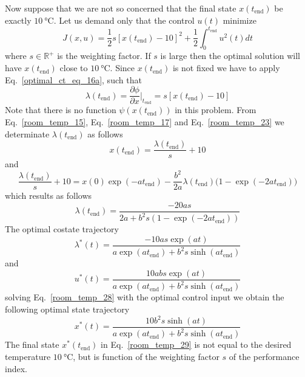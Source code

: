 \documentclass[12pt,a4paper,oneside]{book}
\begin{document}
\begin{onehalfspace}
\begin{example}
	Now suppose that we are not so concerned that the final state 
	$x(t_\text{end})$ be exactly $\SI{10}{\celsius}$. Let us demand only that 
	the control $u(t)$ 
	minimize
	\begin{equation}\label{room_temp_22}
		J(x,u)=\frac{1}{2}s[x(t_\text{end})-10]^2+\frac{1}{2} 
		\int_{0}^{t_\text{end}}u^2(t)dt
	\end{equation}
	where $s\in\mathbb{R}^+$ is the weighting factor. If $s$ is large then the 
	optimal solution will have $x(t_\text{end})$ close to $\SI{10}{\celsius}$. 
	Since $x(t_\text{end})$ is not fixed we have to apply 
	Eq.~\ref{optimal_ct_eq_16a}, such that
	\begin{equation}\label{room_temp_23}
		\lambda(t_\text{end})=\frac{\partial \phi}{\partial 
			x}\Big|_{t_\text{end}}=s[x(t_\text{end})-10]
	\end{equation}
	Note that there is no function $\psi(x(t_\text{end}))$ in this problem. 
	From Eq.~\eqref{room_temp_15}, Eq.~\eqref{room_temp_17} and 
	Eq.~\eqref{room_temp_23} we determinate $\lambda(t_\text{end})$ as follows
	\begin{equation}\label{room_temp_24}
		x(t_\text{end}) = \frac{\lambda(t_\text{end})}{s}+10
	\end{equation}
	and 
	\begin{equation}\label{room_temp_25}
		\frac{\lambda(t_\text{end})}{s}+10 = 
		x(0)\exp(-at_\text{end})-\frac{b^2}{2a}\lambda(t_\text{end}) 
		\Big(1-\exp(-2at_\text{end})\Big)
	\end{equation}
	which results as follows
	\begin{equation}\label{room_temp_26}
		\lambda(t_\text{end})=\frac{-20as}{2a+b^2s(1-\exp(-2at_\text{end}))}
	\end{equation}
	The optimal costate trajectory 
	\begin{equation}\label{room_temp_27}
		\lambda^*(t) = \frac{-10as\exp(at)}{a\exp(at_\text{end})+ 
			b^2s\sinh(at_\text{end})}
	\end{equation}
	and 
	\begin{equation}\label{room_temp_28}
		u^*(t) = 
		\frac{10abs\exp(at)}{a\exp(at_\text{end})+b^2s\sinh(at_\text{end})}
	\end{equation}
	solving Eq.~\eqref{room_temp_28} with the optimal control input we obtain 
	the following optimal state trajectory 
	\begin{equation}\label{room_temp_29}
		x^*(t) = \frac{10b^2s\sinh(at)}{a\exp(at_\text{end}) 
			+b^2s\sinh(at_\text{end})}
	\end{equation}
	The final state $x^*(t_\text{end})$ in Eq.~\eqref{room_temp_29} is not 
	equal to the desired temperature $\SI{10}{\celsius}$, but is function of 
	the weighting factor $s$ of the performance index.
	

\end{example}
\end{onehalfspace}
\end{document}
